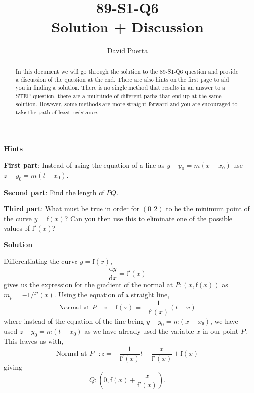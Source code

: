 \documentclass{article}
\title{89-S1-Q6 \\ Solution + Discussion}
\author{David Puerta}
\date{}
\begin{document}
\maketitle

\begin{abstract}
    \noindent In this document we will go through the solution to the 89-S1-Q6 question and provide a discussion of the question at the end. There are also hints on the first page to aid you in finding a solution. There is no single method that results in an answer to a STEP question, there are a multitude of different paths that end up at the same solution. However, some methods are more straight forward and you are encouraged to take the path of least resistance.  
\end{abstract}

\vspace{1cm}

\begin{center}
    \textbf{Hints}
\end{center}

\textbf{First part}: Instead of using the equation of a line as $y-y_0=m(x-x_0)$ use $z-y_0=m(t-x_0)$. 

\vspace{1cm}

\textbf{Second part}:  Find the length of $PQ$.

\vspace{1cm}

\textbf{Third part}: What must be true in order for $(0,2)$ to be the minimum point of the curve $y=\mathrm{f}(x)$? Can you then use this to eliminate one of the possible values of $\mathrm{f}'(x)$?



\newpage

\begin{center}
    \textbf{Solution}
\end{center}

\vspace{0.5cm}

Differentiating the curve $y=\mathrm{f} (x)$,
\[
\frac{\mathrm{d}y}{\mathrm{d}x}= \mathrm{f}'(x)
\]
gives us the expression for the gradient of the normal at $P:(x,\mathrm{f}(x))$ as $m_p=-1 / \mathrm{f}'(x)$. Using the equation of a straight line,
\[
\text{Normal at $P$ }: z-\mathrm{f}(x) = -\frac{1}{\mathrm{f}'(x)} (t-x)
\]
where instead of the equation of the line being $y-y_0=m(x-x_0)$, we have used $z-y_0=m(t-x_0)$ as we have already used the variable $x$ in our point $P$. This leaves us with,
\[
\text{Normal at $P$ }: z = -\frac{1}{\mathrm{f}'(x)}t + \frac{x}{\mathrm{f}'(x)}+\mathrm{f}(x)
\]
giving 
\[
Q:\left(0 ,  \mathrm{f}(x)+\frac{x}{\mathrm{f}'(x)}\right).
\]
\end{document}
